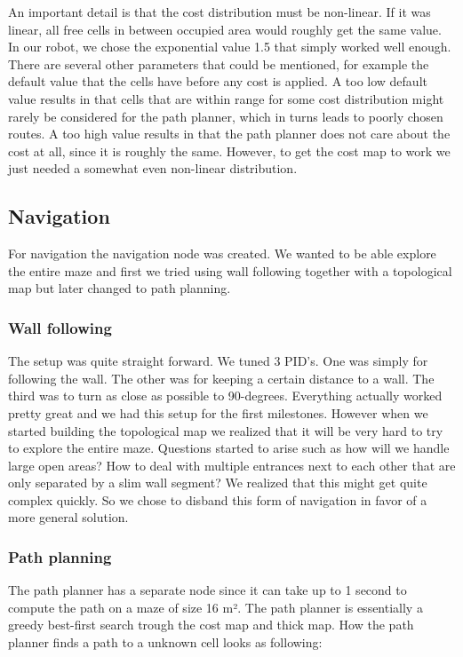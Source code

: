 An important detail is that the cost distribution must be non-linear. If it was linear, all free cells in between occupied area would roughly get the same value. In our robot, we chose the exponential value 1.5 that simply worked well enough. There are several other parameters that could be mentioned, for example the default value that the cells have before any cost is applied. A too low default value results in that cells that are within range for some cost distribution might rarely be considered for the path planner, which in turns leads to poorly chosen routes. A too high value results in that the path planner does not care about the cost at all, since it is roughly the same. However, to get the cost map to work we just needed a somewhat even non-linear distribution. 


\subsection{Navigation}
For navigation the navigation node was created. We wanted to be able explore the entire maze and first we tried using wall following together with a topological map but later changed to path planning. 

\subsubsection{Wall following}
The setup was quite straight forward. We tuned 3 PID’s. One was simply for following the wall. The other was for keeping a certain distance to a wall. The third was to turn as close as possible to 90-degrees. Everything actually worked pretty great and we had this setup for the first milestones. However when we started building the topological map we realized that it will be very hard to try to explore the entire maze. Questions started to arise such as how will we handle large open areas? How to deal with multiple entrances next to each other that are only separated by a slim wall segment? We realized that this might get quite complex quickly. So we chose to disband this form of navigation in favor of a more general solution.

\subsubsection{Path planning}
The path planner has a separate node since it can take up to 1 second to compute the path on a maze of size 16 m². The path planner is essentially a greedy best-first search trough the cost map and thick map. How the path planner finds a path to a unknown cell looks as following:

